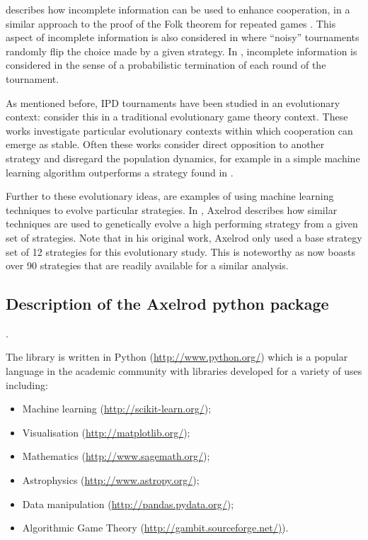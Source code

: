 \documentclass{article}
\begin{document}
\cite{Milgrom1982} describes how incomplete information can be used to
enhance cooperation, in a similar approach to the proof of the Folk theorem for
repeated games \cite{Maschler2013}. This aspect of incomplete information is
also considered in \cite{Molander1985, Bendor1991, Lee2015} where ``noisy''
tournaments randomly flip the choice made by a given strategy. In
\cite{Murnighan2015}, incomplete information is considered in the sense of a
probabilistic termination of each round of the tournament.

As mentioned before, IPD tournaments have been studied in an evolutionary
context: \cite{Ellison1994, Lee2015, Press2012, Stewart2012} consider this in a
traditional evolutionary game theory context. These works investigate
particular evolutionary contexts within which cooperation can emerge as stable.
Often these works consider direct opposition to another strategy and disregard
the population dynamics, for example in \cite{Lee2015} a simple machine learning
algorithm outperforms a strategy found in \cite{Press2012}.

Further to these evolutionary ideas, \cite{Chellapilla1999, DavidB1993} are
examples of using machine learning techniques to evolve particular strategies.
In \cite{Axelrod}, Axelrod describes how similar techniques are used to
genetically evolve a high performing strategy from a given set of strategies.
Note that in his original work, Axelrod only used a base strategy set of 12
strategies for this evolutionary study. This is noteworthy as
\cite{Axelrod-Pythonprojectteam2015} now boasts over 90 strategies that are
readily available for a similar analysis.

\subsection{Description of the Axelrod python package}\label{sec:description-of-axelrod-python}.

The library is written in Python (\url{http://www.python.org/}) which is a
popular language in the academic community with libraries developed for a
variety of uses including:

\begin{itemize}
    \item Machine learning (\url{http://scikit-learn.org/});
    \item Visualisation (\url{http://matplotlib.org/});
    \item Mathematics (\url{http://www.sagemath.org/});
    \item Astrophysics (\url{http://www.astropy.org/});
    \item Data manipulation (\url{http://pandas.pydata.org/});
    \item Algorithmic Game Theory (\url{http://gambit.sourceforge.net/)}).
\end{itemize}
\end{document}
